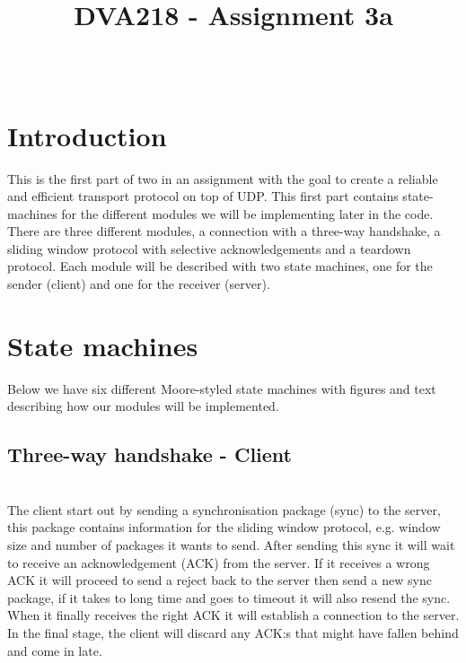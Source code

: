 \documentclass[conference]{IEEEtran}
\begin{document}
\title{DVA218 - Assignment 3a}
\author{
\and
{}
\and
{}}
\maketitle

${}$\hspace{5em}





\section{Introduction}
This is the first part of two in an assignment with the goal to create a reliable and efficient transport protocol on top of UDP. This first part contains state-machines for the different modules we will be implementing later in the code. There are three different modules, a connection with a three-way handshake, a sliding window protocol with selective acknowledgements and a teardown protocol. Each module will be described with two state machines, one for the sender (client) and one for the receiver (server).

\section{State machines}
Below we have six different Moore-styled state machines with figures and text describing how our modules will be implemented.

\subsection{Three-way handshake - Client}
  

\\
The client start out by sending a synchronisation package (sync) to the server, this package contains information for the sliding window protocol, e.g. window size and number of packages it wants to send. After sending this sync it will wait to receive an acknowledgement (ACK) from the server. If it receives a wrong ACK it will proceed to send a reject back to the server then send a new sync package, if it takes to long time and goes to timeout it will also resend the sync. When it finally receives the right ACK it will establish a connection to the server. In the final stage, the client will discard any ACK:s that might have fallen behind and come in late.  
\end{document}
